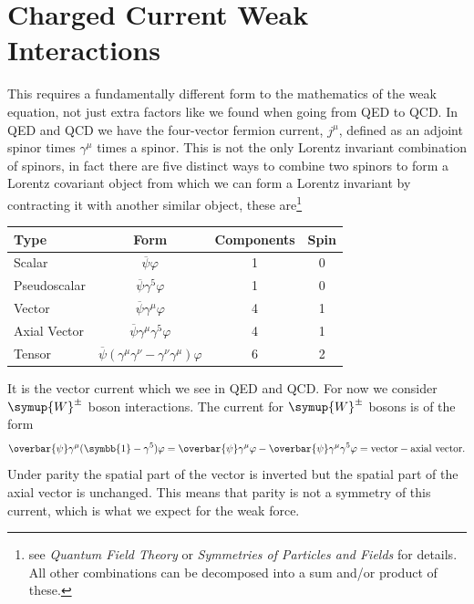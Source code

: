 \documentclass[fleqn]{NotesClass}
\newcommand{\Pparticle}[1]{\symup{#1}}
\newcommand{\PWpm}{\ensuremath{\Pparticle{W}^{\pm}}}
\newcommand{\course}[1]{\textit{#1}}
\newcommand{\diracadjoint}[1]{\overbar{#1}}
\newcommand{\ident}{\symbb{1}}
\begin{document}
    \section{Charged Current Weak Interactions}
    This requires a fundamentally different form to the mathematics of the weak equation, not just extra factors like we found when going from QED to QCD.
    In QED and QCD we have the four-vector fermion current, \(j^\mu\), defined as an adjoint spinor times \(\gamma^\mu\) times a spinor.
    This is not the only Lorentz invariant combination of spinors, in fact there are five distinct ways to combine two spinors to form a Lorentz covariant object from which we can form a Lorentz invariant by contracting it with another similar object, these are\footnote{see \course{Quantum Field Theory} or \course{Symmetries of Particles and Fields} for details. All other combinations can be decomposed into a sum and/or product of these.}
    \begin{center}
        \begin{tabular}{lccc}
            \toprule
            Type & Form & Components & Spin\\ \midrule
            Scalar & \(\diracadjoint{\psi} \varphi\) & 1 & 0\\
            Pseudoscalar & \(\diracadjoint{\psi} \gamma^5 \varphi\) & 1 & 0\\
            Vector & \(\diracadjoint{\psi} \gamma^\mu \varphi\) & 4 & 1\\
            Axial Vector & \(\diracadjoint{\psi} \gamma^\mu \gamma^5 \varphi\) & 4 & 1\\
            Tensor & \(\diracadjoint{\psi} (\gamma^\mu \gamma^\nu - \gamma^\nu \gamma^\mu) \varphi\) & 6 & 2\\\bottomrule
        \end{tabular}
    \end{center}
    
    It is the vector current which we see in QED and QCD.
    For now we consider \PWpm{} boson interactions.
    The current for \PWpm{} bosons is of the form
    \begin{equation}
        \diracadjoint{\psi} \gamma^\mu (\ident - \gamma^5)\varphi = \diracadjoint{\psi} \gamma^\mu \varphi - \diracadjoint{\psi}\gamma^\mu \gamma^5 \varphi = \text{vector} - \text{axial vector}.
    \end{equation}
    Under parity the spatial part of the vector is inverted but the spatial part of the axial vector is unchanged.
    This means that parity is not a symmetry of this current, which is what we expect for the weak force.
    
\end{document}
